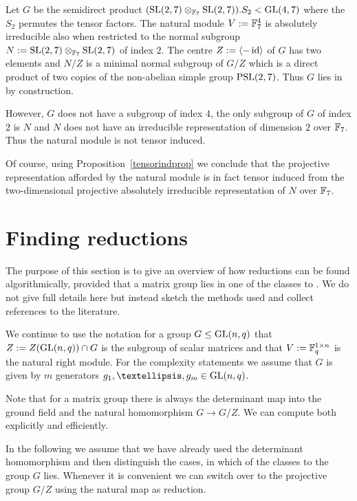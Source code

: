 \begin{Rem}
    \label{nottensorind}
%
    Let $G$ be the semidirect product 
    $(\SL(2,7) \otimes_{\F_7} \SL(2,7)).S_2 < \GL(4,7)$ where the
    $S_2$ permutes the tensor factors. The natural module $V := \mathbb{F}_7^4$ is
    absolutely irreducible also when restricted to the normal subgroup
    $N := \SL(2,7) \otimes_{\F_7} \SL(2,7)$ of index $2$. The centre 
    $Z := \left< -\id \right>$ of $G$ has two elements and $N/Z$ is a
    minimal normal subgroup of $G/Z$ which is a direct product of two
    copies of the non-abelian simple group $\PSL(2,7)$. Thus $G$ lies
    in  by construction.

    However, $G$ does not have a subgroup of index $4$, the only 
    subgroup of $G$ of index $2$ is $N$ and $N$ does
    not have an irreducible representation of dimension $2$ over
    $\mathbb{F}_7$. Thus the natural module is not tensor induced.

    Of course, using Proposition~\ref{tensorindprop} we conclude that
    the projective representation afforded by the natural module is in
    fact tensor induced from the two-dimensional projective
    absolutely irreducible representation of $N$ over $\mathbb{F}_7$.
\end{Rem}

\section{Finding reductions}
\label{findred}
%

The purpose of this section is to give an overview of how reductions can
be found algorithmically, provided that a matrix group
lies in one of the classes  to . We do not give full details
here but instead sketch the methods used and collect references to the
literature.

We continue to use the notation for a group $G \le \GL(n,q)$ that
$Z := Z(\GL(n,q)) \cap G$ is the subgroup of scalar matrices and that
$V := \mathbb{F}_q^{1 \times n}$ is the natural right module. For the
complexity statements we assume that $G$ is given by $m$ generators
$g_1, \ldots, g_m \in \GL(n,q)$.

Note that for a matrix group there is always the determinant map
into the ground field and the natural homomorphism
$G \to G/Z$. We can compute both explicitly and efficiently.

In the following we assume that we have already used the determinant
homomorphism and then distinguish the cases, in which of the classes
 to  the group $G$ lies. Whenever it is convenient we can
switch over to the projective group $G/Z$ using the natural map 
as reduction.

